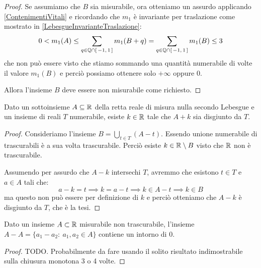 \begin{proof}
	Se assumiamo che $B$ sia misurabile, ora otteniamo un assurdo applicando \cref{ContenimentiVitali} e ricordando che $m_1$ è invariante per traslazione come mostrato in \cref{LebesgueInvarianteTraslazione}:
	\begin{equation*}
		0<m_1(A)\le \sum_{q\in \mathbb Q\cap[\,-1,\,1\,]} m_1(B+q)= \sum_{q\in \mathbb Q\cap[\,-1,\,1\,]} m_1(B) \le 3
	\end{equation*}
	che non può essere visto che stiamo sommando una quantità numerabile di volte il valore $m_1(B)$ e perciò possiamo ottenere solo $+\infty$ oppure $0$.
	
	Allora l'insieme $B$ deve essere non misurabile come richiesto.
\end{proof}

\begin{exercise}
	Dato un sottoinsieme $A\subseteq\mathbb R$ della retta reale di misura nulla secondo Lebesgue e un insieme di reali $T$ numerabile, esiste $k\in \mathbb R$ tale che $A+k$ sia disgiunto da $T$.
\end{exercise}
\begin{proof}
	Consideriamo l'insieme $B=\bigcup_{t\in T} (A-t)$. 
	Essendo unione numerabile di trascurabili è a sua volta trascurabile.
	Perciò esiste $k\in\mathbb R\setminus B$ visto che $\mathbb R$ non è trascurabile.
	
	Assumendo per assurdo che $A-k$ intersechi $T$, avremmo che esistono $t\in T$ e $a\in A$ tali che:
	\begin{equation*}
		a-k=t\implies k=a-t \implies k\in A-t\implies k\in B	
	\end{equation*}
	ma questo non può essere per definizione di $k$ e perciò otteniamo che $A-k$ è disgiunto da $T$, che è la tesi.
\end{proof}

\begin{theorem}[Steinhaus]\label{Steinhaus}
	Dato un insieme $A\subset\mathbb R$ misurabile non trascurabile, l'insieme $A-A=\{a_1-a_2:\ a_1,a_2\in A\}$ contiene un intorno di $0$.
\end{theorem}
\begin{proof}
	TODO.
	Probabilmente da fare usando il solito risultato indimostrabile sulla chiusura monotona 3 o 4 volte.
\end{proof}


